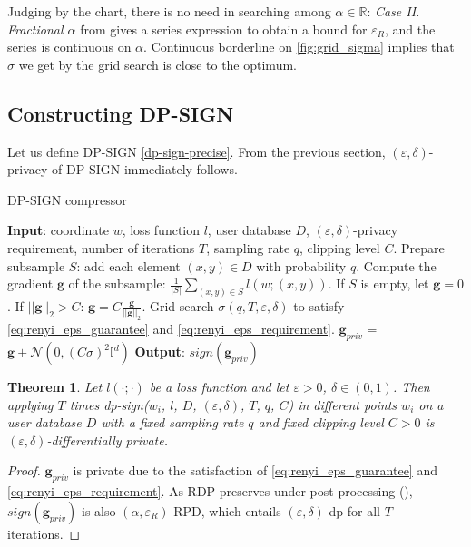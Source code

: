 \documentclass[12pt]{article}
\newcommand{\R}{\mathbb{R}}
\newtheorem{theorem}{Theorem}
\newcommand{\eps}{\varepsilon}
\begin{document}
Judging by the chart, there is no need in searching among $\alpha \in \R$: \textit{Case II. Fractional $\alpha$} from \cite{mironov2019SGM} gives a series expression to obtain a bound for $\eps_R$, and the series is continuous on $\alpha$. Continuous borderline on \ref{fig:grid_sigma} implies that $\sigma$ we get by the grid search is close to the optimum.

\subsection{Constructing DP-SIGN}
Let us define {\scriptsize DP-SIGN} \ref{dp-sign-precise}. From the previous section, $(\eps, \delta)$-privacy of {\scriptsize DP-SIGN} immediately follows.
\newcommand{\gradg}{\boldsymbol{g}}
\begin{algorithm}
    \caption{DP-SIGN compressor}
    \label{dp-sign-precise}
    \begin{algorithmic}
        \STATE \textbf{Input}: coordinate $w$, loss function $l$, user database $D$, $(\eps, \delta)$-privacy requirement, number of iterations $T$, sampling rate $q$, clipping level $C$.
        \STATE Prepare subsample $S$: add each element $(x, y) \in D$ with probability $q$.
        \STATE Compute the gradient $\gradg$ of the subsample: $\frac{1}{|S|}\sum_{(x,y)\in S}l(w;(x,y))$. If $S$ is empty, let $\gradg = 0$.
        \STATE If $||\gradg||_2 > C$: $\gradg = C\frac{\gradg}{||\gradg||_2}$.
        \STATE Grid search $\sigma(q, T, \eps, \delta)$ to satisfy \eqref{eq:renyi_eps_guarantee} and \eqref{eq:renyi_eps_requirement}.
        \STATE $\gradg_{priv}$ = $\gradg + \mathcal{N}(0,(C\sigma)^2\mathbb{I}^d)$
        \STATE \textbf{Output}: $sign(\gradg_{priv})$
    \end{algorithmic}
\end{algorithm}

\begin{theorem}\label{prop:dp_guarantee}
Let $l(\cdot;\cdot)$ be a loss function and let $\eps > 0$, $\delta \in (0,1)$. Then applying $T$ times dp-sign($w_i$, $l$, $D$, $(\eps, \delta)$, $T$, $q$, $C$) in different points $w_i$ on a user database $D$ with a fixed sampling rate $q$ and fixed clipping level $C > 0$ is $(\eps, \delta)$-differentially private.
\end{theorem}
\begin{proof}
$\gradg_{priv}$ is private due to the satisfaction of \eqref{eq:renyi_eps_guarantee} and \eqref{eq:renyi_eps_requirement}. As RDP preserves under post-processing (\cite{Mironov2017}), $sign(\gradg_{priv})$ is also $(\alpha, \eps_R)$-RPD, which entails $(\eps, \delta)$-dp for all $T$ iterations.
\end{proof}
\end{document}
